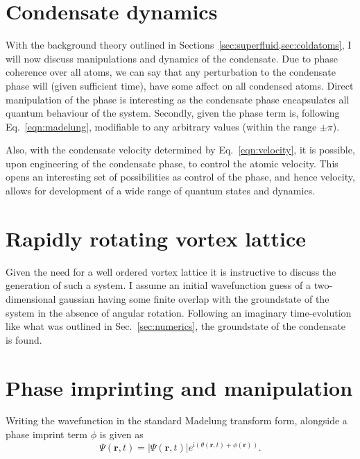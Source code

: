 \section{Condensate dynamics}
With the background theory outlined in Sections~\ref{sec:superfluid,sec:coldatoms}, I will now discuss manipulations and dynamics of the condensate. Due to phase coherence over all atoms, we can say that any perturbation to the condensate phase will (given sufficient time), have some affect on all condensed atoms. Direct manipulation of the phase is interesting as the condensate phase encapsulates all quantum behaviour of the system. Secondly, given the phase term is, following Eq.~\ref{eqn:madelung}, modifiable to any arbitrary values (within the range $\pm \pi$).

Also, with the condensate velocity determined by Eq.~\ref{eqn:velocity}, it is possible, upon engineering of the condensate phase, to control the atomic velocity. This opens an interesting set of possibilities as control of the phase, and hence velocity, allows for development of a wide range of quantum states and dynamics.



\section{Rapidly rotating vortex lattice}
Given the need for a well ordered vortex lattice it is instructive to discuss the generation of such a system. I assume an initial wavefunction guess of a two-dimensional gaussian having some finite overlap with the groundstate of the system in the absence of angular rotation. Following an imaginary time-evolution like what was outlined in Sec.~\ref{sec:numerics}, the groundstate of the condensate is found.



\section{Phase imprinting and manipulation}
Writing the wavefunction in the standard Madelung transform form, alongside a phase imprint term $\phi$ is given as
\begin{equation}
    \Psi(\mathbf{r},t) = |\Psi(\mathbf{r},t)|e^{\text{i}(\theta(\mathbf{r},t) + \phi(\mathbf{r}))}.
\end{equation}


